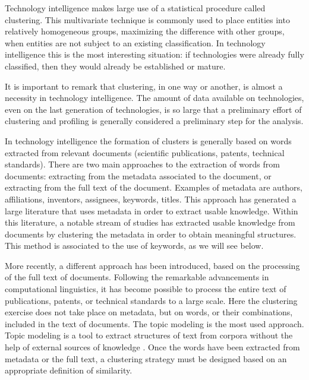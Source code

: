 \documentclass[]{book}
\theoremstyle{definition}
\theoremstyle{definition}
\theoremstyle{definition}
\theoremstyle{remark}
\begin{document}
Technology intelligence makes large use of a statistical procedure
called clustering. This multivariate technique is commonly used to place
entities into relatively homogeneous groups, maximizing the difference
with other groups, when entities are not subject to an existing
classification. In technology intelligence this is the most interesting
situation: if technologies were already fully classified, then they
would already be established or mature.

It is important to remark that clustering, in one way or another, is
almost a necessity in technology intelligence. The amount of data
available on technologies, even on the last generation of technologies,
is so large that a preliminary effort of clustering and profiling is
generally considered a preliminary step for the analysis.

In technology intelligence the formation of clusters is generally based
on words extracted from relevant documents (scientific publications,
patents, technical standards). There are two main approaches to the
extraction of words from documents: extracting from the metadata
associated to the document, or extracting from the full text of the
document. Examples of metadata are authors, affiliations, inventors,
assignees, keywords, titles. This approach has generated a large
literature that uses metadata in order to extract usable knowledge.
Within this literature, a notable stream of studies has extracted usable
knowledge from documents by clustering the metadata in order to obtain
meaningful structures. This method is associated to the use of keywords,
as we will see below.

More recently, a different approach has been introduced, based on the
processing of the full text of documents. Following the remarkable
advancements in computational linguistics, it has become possible to
process the entire text of publications, patents, or technical standards
to a large scale. Here the clustering exercise does not take place on
metadata, but on words, or their combinations, included in the text of
documents. The topic modeling is the most used approach. Topic modeling
is a tool to extract structures of text from corpora without the help of
external sources of knowledge \citep{blei2003latent}. Once the words
have been extracted from metadata or the full text, a clustering
strategy must be designed based on an appropriate definition of
similarity.
\end{document}
